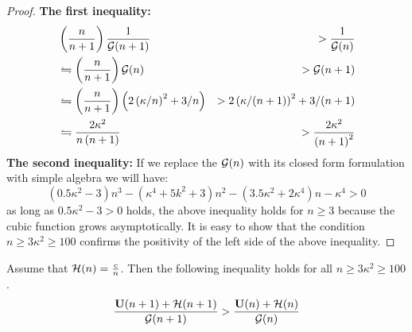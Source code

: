 \documentclass{article}
\begin{document}
\begin{proof}
	\textbf{The first inequality:}
	\begin{eqnarray*}	
		& \left( \frac{n}{n+1}\right) \frac{1}{{\cal G}(n+1)}  & > 
	\frac{1}{{\cal G}(n)} \\ 
	  &\leftrightharpoons  \left( \frac{n}{n+1}\right)  {\cal G}(n) & > {\cal G}(n+1) \\
	   & \leftrightharpoons  \left( \frac{n}{n+1}\right) \left(2\left(
	   \kappa/n\right)^2 + 3/n \right) & > 2\left( \kappa/(n+1)\right)^2 + 3/(n+1) \\ 
	   & \leftrightharpoons  \frac{2 \kappa^2}{n\left(n+1\right)} & >  \frac{2
	   \kappa^2}{\left(n+1\right)^2}
	\end{eqnarray*}
	\textbf{The second inequality:}
	If we replace the ${\cal G}(n)$ with its closed form formulation with simple
	algebra we will have:
	\begin{equation*}
		(0.5 \kappa^2-3) n^3 -(\kappa^4 + 5 k^2 +3 ) n^2 -(3.5 \kappa^2 +2 \kappa^4) n
		-\kappa^4 >0
	\end{equation*}
	as long as $0.5 \kappa^2 - 3 >0$ holds, the above inequality holds for
	$n\geq 3 $ because the cubic function grows asymptotically. It is easy to show
	that the condition $n\geq 3 \kappa^2 \geq 100$ confirms the positivity of the
	left side of the above inequality.
\end{proof}
\begin{lemma}
	Assume that ${\cal H}(n) = \frac{c}{n}$. Then the
	following inequality holds for all $n \geq 3 \kappa^2 \geq 100$.
	  \begin{equation*}
		\frac{\mathbf U(n+1)+{\cal H}(n+1)}{{\cal G}(n+1)} >
		\frac{\mathbf U(n)+{\cal H}(n)}{{\cal G}(n)}
	\end{equation*}
\end{lemma}
\end{document}
